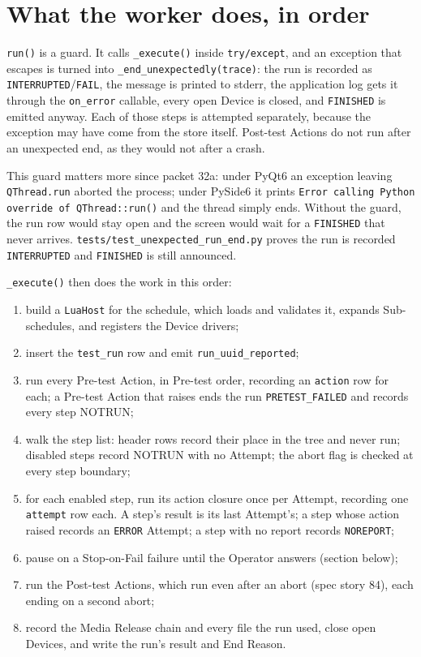 \section{What the worker does, in order}

\texttt{run()} is a guard. It calls \texttt{\_execute()} inside \texttt{try/except}, and an exception
that escapes is turned into \texttt{\_\allowbreak{}end\_\allowbreak{}unexpectedly(trace)}: the run is recorded as
\texttt{INTERRUPTED}/\texttt{FAIL}, the message is printed to stderr, the application log gets it
through the \texttt{on\_error} callable, every open Device is closed, and \texttt{FINISHED} is emitted
anyway. Each of those steps is attempted separately, because the exception may have come from the store
itself. Post-test Actions do not run after an unexpected end, as they would not after a crash.

This guard matters more since packet 32a: under PyQt6 an exception leaving \texttt{QThread.run} aborted
the process; under PySide6 it prints \texttt{Error calling Python override of QThread::run()} and the
thread simply ends. Without the guard, the run row would stay open and the screen would wait for a
\texttt{FINISHED} that never arrives. \texttt{tests/\allowbreak{}test\_\allowbreak{}unexpected\_\allowbreak{}run\_\allowbreak{}end.py} proves the run is
recorded \texttt{INTERRUPTED} and \texttt{FINISHED} is still announced.

\texttt{\_execute()} then does the work in this order:

\begin{enumerate}
  \item build a \texttt{LuaHost} for the schedule, which loads and validates it, expands
    Sub-schedules, and registers the Device drivers;
  \item insert the \texttt{test\_run} row and emit \texttt{run\_uuid\_reported};
  \item run every Pre-test Action, in Pre-test order, recording an \texttt{action} row for each; a
    Pre-test Action that raises ends the run \texttt{PRETEST\_FAILED} and records every step NOTRUN;
  \item walk the step list: header rows record their place in the tree and never run; disabled steps
    record NOTRUN with no Attempt; the abort flag is checked at every step boundary;
  \item for each enabled step, run its action closure once per Attempt, recording one \texttt{attempt}
    row each. A step's result is its last Attempt's; a step whose action raised records an
    \texttt{ERROR} Attempt; a step with no report records \texttt{NOREPORT};
  \item pause on a Stop-on-Fail failure until the Operator answers (section below);
  \item run the Post-test Actions, which run even after an abort (spec story 84), each ending on a second
    abort;
  \item record the Media Release chain and every file the run used, close open Devices, and write the
    run's result and End Reason.
\end{enumerate}

